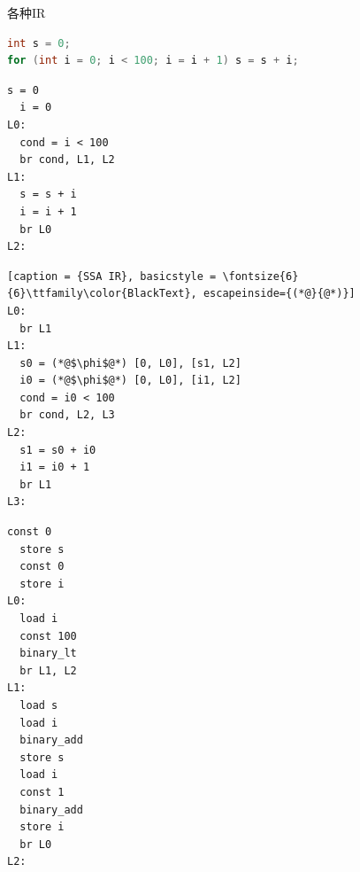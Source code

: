 \documentclass{beamer}
\begin{document}
\begin{frame}[fragile]{各种IR}

\begin{minipage}{1.0\linewidth}
\begin{lstlisting}[language=C]
int s = 0;
for (int i = 0; i < 100; i = i + 1) s = s + i;
\end{lstlisting}
\end{minipage}

\begin{minipage}{0.22\textwidth}
\begin{lstlisting}[caption = {Reg IR}, basicstyle = \fontsize{6}{6}\ttfamily\color{BlackText}]
  s = 0
  i = 0
L0:
  cond = i < 100
  br cond, L1, L2
L1:
  s = s + i
  i = i + 1
  br L0
L2:
\end{lstlisting}
\end{minipage}\hspace{1cm}
\begin{minipage}{0.36\textwidth}
\begin{lstlisting}[caption = {SSA IR}, basicstyle = \fontsize{6}{6}\ttfamily\color{BlackText}, escapeinside={(*@}{@*)}]
L0: 
  br L1
L1:
  s0 = (*@$\phi$@*) [0, L0], [s1, L2]
  i0 = (*@$\phi$@*) [0, L0], [i1, L2]
  cond = i0 < 100
  br cond, L2, L3
L2:
  s1 = s0 + i0
  i1 = i0 + 1
  br L1
L3:
\end{lstlisting}
\end{minipage}\hspace{1cm}
\begin{minipage}{0.16\textwidth}
\begin{lstlisting}[caption = {Stack IR}, basicstyle = \fontsize{6}{6}\ttfamily\color{BlackText}]
  const 0
  store s
  const 0
  store i
L0:
  load i
  const 100
  binary_lt
  br L1, L2
L1:
  load s
  load i
  binary_add
  store s
  load i
  const 1
  binary_add
  store i
  br L0
L2:
\end{lstlisting}
\end{minipage}
\end{frame}
\end{document}
